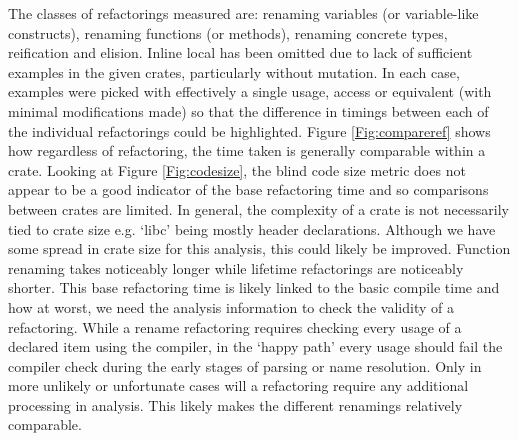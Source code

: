 The classes of refactorings measured are: renaming variables (or variable-like constructs), renaming functions (or methods), renaming concrete types, reification and elision. Inline local has been omitted due to lack of sufficient examples in the given crates, particularly without mutation. In each case, examples were picked with effectively a single usage, access or equivalent (with minimal modifications made) so that the difference in timings between each of the individual refactorings could be highlighted. Figure \ref{Fig:compareref} shows how regardless of refactoring, the time taken is generally comparable within a crate. Looking at Figure \ref{Fig:codesize}, the blind code size metric does not appear to be a good indicator of the base refactoring time and so comparisons between crates are limited. In general, the complexity of a crate is not necessarily tied to crate size e.g. `libc' being mostly header declarations. Although we have some spread in crate size for this analysis, this could likely be improved. Function renaming takes noticeably longer while lifetime refactorings are noticeably shorter. This base refactoring time is likely linked to the basic compile time and how at worst, we need the analysis information to check the validity of a refactoring. While a rename refactoring requires checking every usage of a declared item using the compiler, in the `happy path' every usage should fail the compiler check during the early stages of parsing or name resolution. Only in more unlikely or unfortunate cases will a refactoring require any additional processing in analysis. This likely makes the different renamings relatively comparable. 

